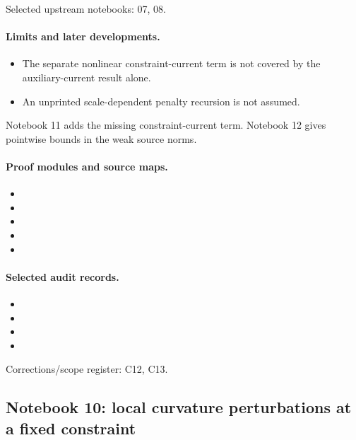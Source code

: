\documentclass[11pt]{article}
\theoremstyle{remark}
\begin{document}
Selected upstream notebooks: 07, 08.\par

\paragraph{Limits and later developments.}
\begin{itemize}
\item The separate nonlinear constraint-current term is not covered by the auxiliary-current result alone.
\item An unprinted scale-dependent penalty recursion is not assumed.
\end{itemize}

Notebook 11 adds the missing constraint-current term. Notebook 12 gives pointwise bounds in the weak source norms.

\paragraph{Proof modules and source maps.}
\begingroup\small
\begin{itemize}
\item {}
\item {}
\item {}
\item {}
\item {}
\end{itemize}
\endgroup

\paragraph{Selected audit records.}
\begingroup\small
\begin{itemize}
\item {}
\item {}
\item {}
\item {}
\end{itemize}
\endgroup
Corrections/scope register: C12, C13.\par

\subsection{Notebook 10: local curvature perturbations at a fixed constraint}
\label{hnc-10}
\noindent{}\par
\end{document}
